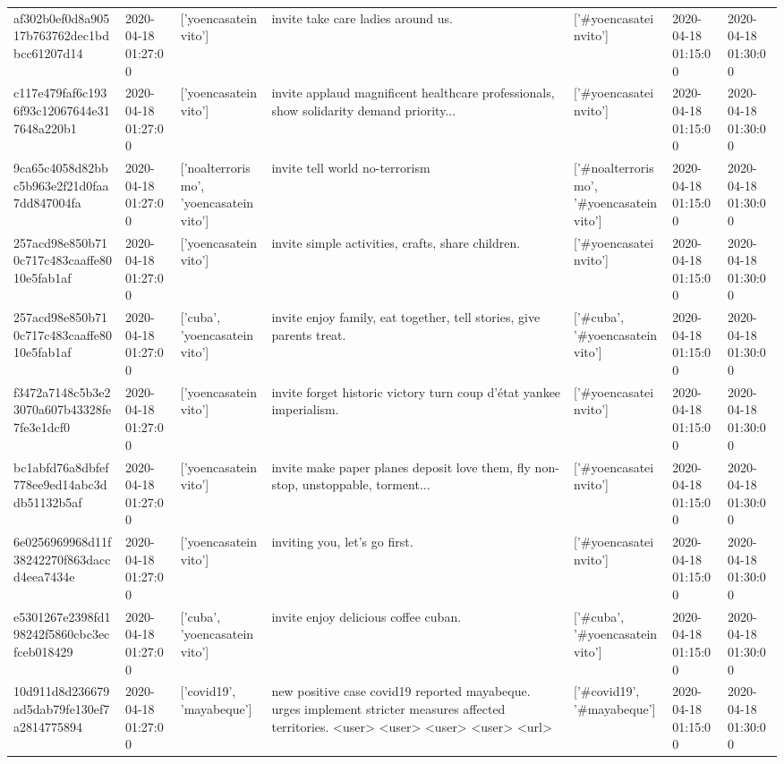 \begin{tabular}{lllllll}
af302b0ef0d8a90517b763762dec1bdbcc61207d14 & 2020-04-18 01:27:00 & ['yoencasateinvito'] & invite take care ladies around us. & ['#yoencasateinvito'] & 2020-04-18 01:15:00 & 2020-04-18 01:30:00 \\
c117e479faf6c1936f93c12067644e317648a220b1 & 2020-04-18 01:27:00 & ['yoencasateinvito'] & invite applaud magnificent healthcare professionals, show solidarity demand priority... & ['#yoencasateinvito'] & 2020-04-18 01:15:00 & 2020-04-18 01:30:00 \\
9ca65c4058d82bbc5b963e2f21d0faa7dd847004fa & 2020-04-18 01:27:00 & ['noalterrorismo', 'yoencasateinvito'] & invite tell world no-terrorism & ['#noalterrorismo', '#yoencasateinvito'] & 2020-04-18 01:15:00 & 2020-04-18 01:30:00 \\
257acd98e850b710c717c483caaffe8010e5fab1af & 2020-04-18 01:27:00 & ['yoencasateinvito'] & invite simple activities, crafts, share children. & ['#yoencasateinvito'] & 2020-04-18 01:15:00 & 2020-04-18 01:30:00 \\
257acd98e850b710c717c483caaffe8010e5fab1af & 2020-04-18 01:27:00 & ['cuba', 'yoencasateinvito'] & invite enjoy family, eat together, tell stories, give parents treat. & ['#cuba', '#yoencasateinvito'] & 2020-04-18 01:15:00 & 2020-04-18 01:30:00 \\
f3472a7148c5b3e23070a607b43328fe7fe3e1dcf0 & 2020-04-18 01:27:00 & ['yoencasateinvito'] & invite forget historic victory turn coup d'état yankee imperialism. & ['#yoencasateinvito'] & 2020-04-18 01:15:00 & 2020-04-18 01:30:00 \\
bc1abfd76a8dbfef778ee9ed14abc3ddb51132b5af & 2020-04-18 01:27:00 & ['yoencasateinvito'] & invite make paper planes deposit love them, fly non-stop, unstoppable, torment... & ['#yoencasateinvito'] & 2020-04-18 01:15:00 & 2020-04-18 01:30:00 \\
6e0256969968d11f38242270f863daccd4eea7434e & 2020-04-18 01:27:00 & ['yoencasateinvito'] & inviting you, let's go first. & ['#yoencasateinvito'] & 2020-04-18 01:15:00 & 2020-04-18 01:30:00 \\
e5301267e2398fd198242f5860cbc3ecfceb018429 & 2020-04-18 01:27:00 & ['cuba', 'yoencasateinvito'] & invite enjoy delicious coffee cuban. & ['#cuba', '#yoencasateinvito'] & 2020-04-18 01:15:00 & 2020-04-18 01:30:00 \\
10d911d8d236679ad5dab79fe130ef7a2814775894 & 2020-04-18 01:27:00 & ['covid19', 'mayabeque'] & new positive case covid19 reported mayabeque. urges implement stricter measures affected territories. <user> <user> <user> <user> <url> & ['#covid19', '#mayabeque'] & 2020-04-18 01:15:00 & 2020-04-18 01:30:00 \\

\end{tabular}
